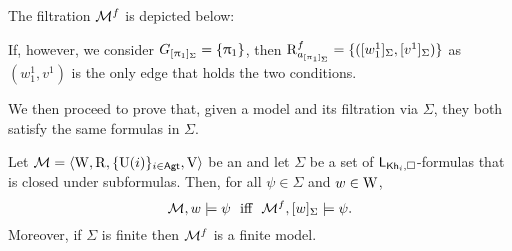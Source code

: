 \begin{example}
\medskip

The filtration $\mathcal{M}^f$ is depicted below:

\begin{center}
\end{center}

If, however, we consider $G_{[\uppi_1]_\Sigma} = \{ \uppi_1 \}$, then $\operatorname{R}^f_{a_{[\uppi_1]_\Sigma}} = \{ ([w^1_1]_\Sigma,[v^1]_\Sigma) \}$ as $(w^1_1,v^1)$ is the only edge that holds the two conditions.
\end{example}

\medskip

We then proceed to prove that, given a model and its filtration via $\Sigma$, they both satisfy the same formulas in $\Sigma$.

\medskip

\begin{theorem}\label{th:filtration}
Let $\mathcal{M} = \langle \operatorname{W},\operatorname{R}, \{ \operatorname{U}(i) \}_{i\in {\rm \sf Agt}}, \operatorname{V} \rangle$ be an \ults and
let $\Sigma$ be a set of $\mathsf{L}_{{\sf Kh}_i,\square}$-formulas that is closed under subformulas.
Then, for all $\psi\in\Sigma$ and $w\in\operatorname{W}$, 
\[
    \modults,w\models \psi \ \mbox{  iff  } \ \modults^f,[w]_\Sigma\models \psi.
\] 
Moreover, if $\Sigma$ is finite then $\mathcal{M}^f$ is a finite model.
\end{theorem}

